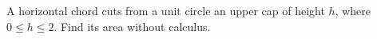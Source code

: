 A horizontal chord cuts from a unit circle an upper cap of height $h$, where $0\le h\le2$. Find its area without calculus.
